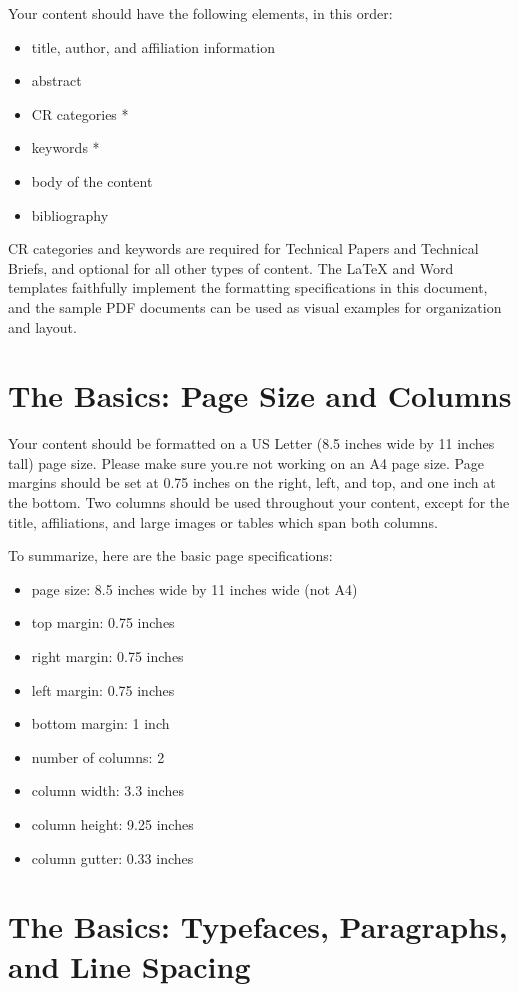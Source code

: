 \documentclass[tog]{acmsiggraph}
\begin{document}
Your content should have the following elements, in this order:
\begin{itemize}
\item title, author, and affiliation information
\item abstract
\item CR categories *
\item keywords *
\item body of the content
\item bibliography
\end{itemize}

CR categories and keywords are required for Technical Papers and
Technical Briefs, and optional for all other types of content. The
\LaTeX{} and Word templates faithfully implement the formatting
specifications in this document, and the sample PDF documents can be
used as visual examples for organization and layout.

\section{The Basics: Page Size and Columns}

Your content should be formatted on a US Letter (8.5 inches wide by 11
inches tall) page size. Please make sure you.re not working on an A4
page size. Page margins should be set at 0.75 inches on the right,
left, and top, and one inch at the bottom. Two columns should be used
throughout your content, except for the title, affiliations, and large
images or tables which span both columns.

To summarize, here are the basic page specifications: 
\begin{itemize}
\item page size: 8.5 inches wide by 11 inches wide (not A4)
\item top margin: 0.75 inches
\item right margin: 0.75 inches
\item left margin: 0.75 inches
\item bottom margin: 1 inch
\item number of columns: 2
\item column width: 3.3 inches
\item column height: 9.25 inches
\item column gutter: 0.33 inches
\end{itemize}

\section{The Basics: Typefaces, Paragraphs, and Line Spacing}
\end{document}
